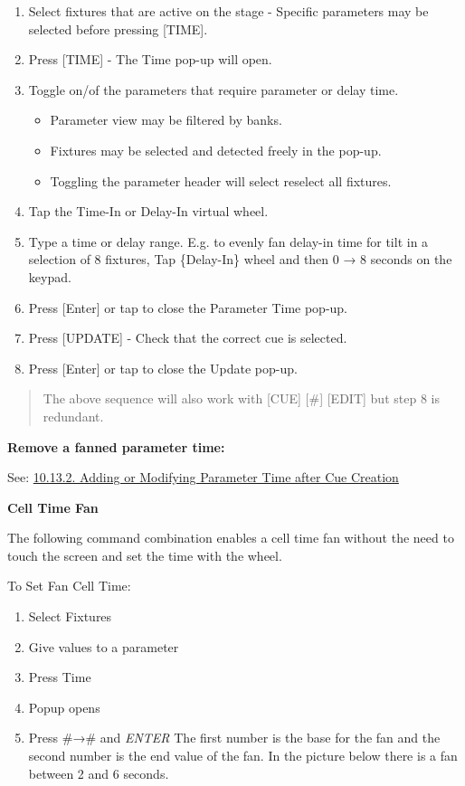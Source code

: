 \documentclass[
]{article}
\begin{document}
\begin{enumerate}
\def\labelenumi{\arabic{enumi}.}
\item
  Select fixtures that are active on the stage - Specific parameters may be selected before pressing {[}TIME{]}.
\item
  Press {[}TIME{]} - The Time pop-up will open.
\item
  Toggle on/of the parameters that require parameter or delay time.

  \begin{itemize}
  \item
    Parameter view may be filtered by banks.
  \item
    Fixtures may be selected and detected freely in the pop-up.
  \item
    Toggling the parameter header will select reselect all fixtures.
  \end{itemize}
\item
  Tap the Time-In or Delay-In virtual wheel.
\item
  Type a time or delay range. E.g. to evenly fan delay-in time for tilt in a selection of 8 fixtures, Tap \{Delay-In\} wheel and then 0 → 8 seconds on the keypad.
\item
  Press {[}Enter{]} or tap \href{image.png}{} to close the Parameter Time pop-up.
\item
  Press {[}UPDATE{]} - Check that the correct cue is selected.
\item
  Press {[}Enter{]} or tap \href{image.png}{} to close the Update pop-up.
\end{enumerate}

\begin{quote}
The above sequence will also work with {[}CUE{]} {[}\#{]} {[}EDIT{]} but step 8 is redundant.
\end{quote}

\textbf{Remove a fanned parameter time:}

See: \href{https://vibemanual.compulite.com/programming-cues-and-scenes.html\#adding-or-modifying-parameter-time-after-cue-creation}{10.13.2. Adding or Modifying Parameter Time after Cue Creation}

\textbf{Cell Time Fan}

The following command combination enables a cell time fan without the need to touch the screen and set the time with the wheel.

To Set Fan Cell Time:

\begin{enumerate}
\def\labelenumi{\arabic{enumi}.}
\item
  Select Fixtures
\item
  Give values to a parameter
\item
  Press Time
\item
  Popup opens
\item
  Press \#→\# and \emph{ENTER} The first number is the base for the fan and the second number is the end value of the fan. In the picture below there is a fan between 2 and 6 seconds.
\end{enumerate}
\end{document}
